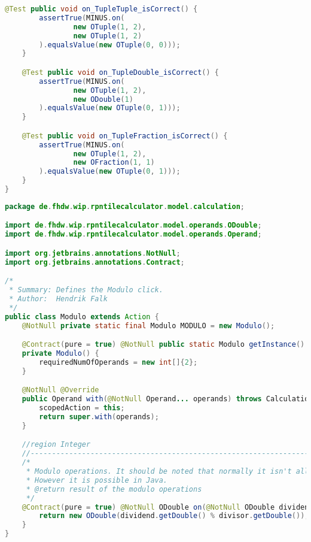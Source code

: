 \begin{lstlisting}[caption=MinusTest (Schwenke),label=list:MinusTest,language=Java]
    @Test public void on_TupleTuple_isCorrect() {
        assertTrue(MINUS.on(
                new OTuple(1, 2),
                new OTuple(1, 2)
        ).equalsValue(new OTuple(0, 0)));
    }

    @Test public void on_TupleDouble_isCorrect() {
        assertTrue(MINUS.on(
                new OTuple(1, 2),
                new ODouble(1)
        ).equalsValue(new OTuple(0, 1)));
    }

    @Test public void on_TupleFraction_isCorrect() {
        assertTrue(MINUS.on(
                new OTuple(1, 2),
                new OFraction(1, 1)
        ).equalsValue(new OTuple(0, 1)));
    }
}
\end{lstlisting} 

\begin{lstlisting}[caption=Modulo (Falk),label=list:Modulo,language=Java]
package de.fhdw.wip.rpntilecalculator.model.calculation;

import de.fhdw.wip.rpntilecalculator.model.operands.ODouble;
import de.fhdw.wip.rpntilecalculator.model.operands.Operand;

import org.jetbrains.annotations.NotNull;
import org.jetbrains.annotations.Contract;

/*
 * Summary: Defines the Modulo click.
 * Author:  Hendrik Falk
 */
public class Modulo extends Action {
    @NotNull private static final Modulo MODULO = new Modulo();

    @Contract(pure = true) @NotNull public static Modulo getInstance() { return MODULO; }
    private Modulo() {
        requiredNumOfOperands = new int[]{2};
    }

    @NotNull @Override
    public Operand with(@NotNull Operand... operands) throws CalculationException {
        scopedAction = this;
        return super.with(operands);
    }

    //region Integer
    //------------------------------------------------------------------------------------
    /*
     * Modulo operations. It should be noted that normally it isn't allow to modulo with floating numbers.
     * However it is possible in Java.
     * @return result of the modulo operations
     */
    @Contract(pure = true) @NotNull ODouble on(@NotNull ODouble dividend, @NotNull ODouble divisor) {
        return new ODouble(dividend.getDouble() % divisor.getDouble());
    }
}
\end{lstlisting}    

